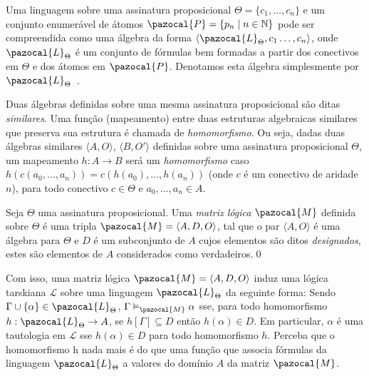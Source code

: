         \begin{observacao}
            Uma linguagem sobre uma assinatura proposicional $\Theta = \{c_{1}, \ldots, c_{n}\}$ e um conjunto enumerável de átomos $\pazocal{P} = \{p_{n} \; | \; n \in \mathbb{N} \}$ pode ser compreendida como uma álgebra da forma $\langle \pazocal{L}_{\Theta}, c_{1}\ldots, c_{n} \rangle$, onde $\pazocal{L}_{\Theta}$ é um conjunto de fórmulas bem formadas a partir dos conectivos em $\Theta$ e dos átomos em $\pazocal{P}$. Denotamos esta álgebra simplesmente por $\pazocal{L}_{\Theta}$~\cite{Sikorski1966-SIKAOF,Wojcicki1984-WJCLOP}.
        \end{observacao}

        Duas álgebras definidas sobre uma mesma assinatura proposicional são ditas \textit{similares}. Uma função (mapeamento) entre duas estruturas algebraicas similares que preserva sua estrutura é chamada de \textit{homomorfismo}. Ou seja, dadas duas álgebras similares $\langle A, O \rangle$, $\langle B, O' \rangle$ definidas sobre uma assinatura proposicional $\Theta$, um mapeamento $h : A \rightarrow B$ será um \textit{homomorfismo} caso $h(c(a_{0},\ldots, a_{n})) = c(h(a_{0}),\ldots, h(a_{n}))$ (onde $c$ é um conectivo de aridade $n$), para todo conectivo $c \in \Theta$ e $a_{0},\ldots,a_{n} \in A$.

        \begin{definicao}
            Seja $\Theta$ uma assinatura proposicional. Uma \textit{matriz lógica} $\pazocal{M}$ definida sobre $\Theta$ é uma tripla $\pazocal{M} = \langle A, D, O \rangle$, tal que o par $\langle A, O \rangle$ é uma álgebra para $\Theta$ e $D$ é um subconjunto de $A$ cujos elementos são ditos \textit{designados}, estes são elementos de $A$ considerados como verdadeiros.\qed{}
        \end{definicao}

        Com isso, uma matriz lógica $\pazocal{M} = \langle A, D, O \rangle$ induz uma lógica tarskiana $\mathcal{L}$ sobre uma linguagem $\pazocal{L}_{\Theta}$ da seguinte forma: Sendo $\Gamma \cup \{\alpha\} \in \pazocal{L}_{\Theta}$, $\Gamma \vDash_{\pazocal{M}} \alpha$ sse, para todo homomorfismo $h : \pazocal{L}_{\Theta} \rightarrow A$, se $h[\Gamma] \subseteq D$ então $h(\alpha) \in D$. Em particular, $\alpha$ é uma tautologia em $\mathcal{L}$ sse $h(\alpha) \in D$ para todo homomorfismo $h$. Perceba que o homomorfismo h nada mais é do que uma função que associa fórmulas da linguagem $\pazocal{L}_{\Theta}$ a valores do domínio $A$ da matriz $\pazocal{M}$.

